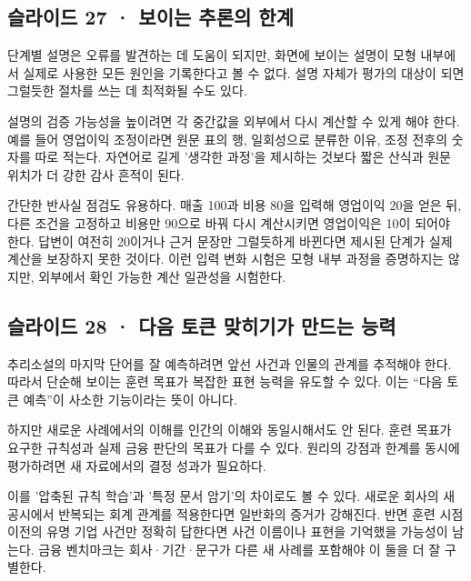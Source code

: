 \documentclass[11pt,a4paper]{article}
\begin{document}
\subsection{슬라이드 27 · 보이는 추론의 한계}
단계별 설명은 오류를 발견하는 데 도움이 되지만, 화면에 보이는 설명이 모형 내부에서 실제로 사용한 모든 원인을 기록한다고 볼 수 없다. 설명 자체가 평가의 대상이 되면 그럴듯한 절차를 쓰는 데 최적화될 수도 있다.\par

설명의 검증 가능성을 높이려면 각 중간값을 외부에서 다시 계산할 수 있게 해야 한다. 예를 들어 영업이익 조정이라면 원문 표의 행, 일회성으로 분류한 이유, 조정 전후의 숫자를 따로 적는다. 자연어로 길게 '생각한 과정'을 제시하는 것보다 짧은 산식과 원문 위치가 더 강한 감사 흔적이 된다.\par

간단한 반사실 점검도 유용하다. 매출 100과 비용 80을 입력해 영업이익 20을 얻은 뒤, 다른 조건을 고정하고 비용만 90으로 바꿔 다시 계산시키면 영업이익은 10이 되어야 한다. 답변이 여전히 20이거나 근거 문장만 그럴듯하게 바뀐다면 제시된 단계가 실제 계산을 보장하지 못한 것이다. 이런 입력 변화 시험은 모형 내부 과정을 증명하지는 않지만, 외부에서 확인 가능한 계산 일관성을 시험한다.\par

\subsection{슬라이드 28 · 다음 토큰 맞히기가 만드는 능력}
추리소설의 마지막 단어를 잘 예측하려면 앞선 사건과 인물의 관계를 추적해야 한다. 따라서 단순해 보이는 훈련 목표가 복잡한 표현 능력을 유도할 수 있다. 이는 “다음 토큰 예측”이 사소한 기능이라는 뜻이 아니다.\par

하지만 새로운 사례에서의 이해를 인간의 이해와 동일시해서도 안 된다. 훈련 목표가 요구한 규칙성과 실제 금융 판단의 목표가 다를 수 있다. 원리의 강점과 한계를 동시에 평가하려면 새 자료에서의 결정 성과가 필요하다.\par

이를 '압축된 규칙 학습'과 '특정 문서 암기'의 차이로도 볼 수 있다. 새로운 회사의 새 공시에서 반복되는 회계 관계를 적용한다면 일반화의 증거가 강해진다. 반면 훈련 시점 이전의 유명 기업 사건만 정확히 답한다면 사건 이름이나 표현을 기억했을 가능성이 남는다. 금융 벤치마크는 회사·기간·문구가 다른 새 사례를 포함해야 이 둘을 더 잘 구별한다.\par

\end{document}
